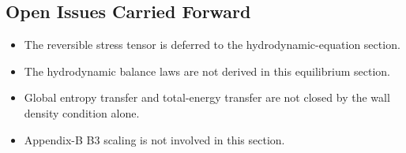 \subsection{Open Issues Carried Forward}

\begin{itemize}
\item The reversible stress tensor is deferred to the hydrodynamic-equation
  section.
\item The hydrodynamic balance laws are not derived in this equilibrium
  section.
\item Global entropy transfer and total-energy transfer are not closed by the
  wall density condition alone.
\item Appendix-B B3 scaling is not involved in this section.
\end{itemize}
